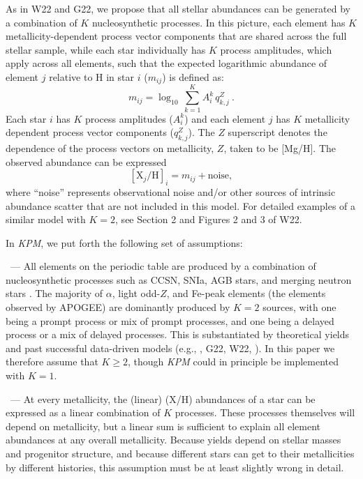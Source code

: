 \documentclass[modern]{aastex631}
\newcommand{\name}{\textsl{KPM}}
\renewcommand{\paragraph}[1]{\bigskip\par\noindent{\textbf{#1}}~---}
\begin{document}
As in W22 and G22, we propose that all stellar abundances can be generated by a combination of $K$ nucleosynthetic processes.
In this picture, each element has $K$ metallicity-dependent process vector components that are shared across the full stellar sample, while each star individually has $K$ process amplitudes, which apply across all elements, such that the expected logarithmic abundance of element $j$ relative to H in star $i$ ($m_{ij}$) is defined as:
\begin{equation}\label{eq:mij_k}
    m_{ij} = \log_{10} \, \sum^K_{k=1} A_i^k \, q_{k,j}^Z ~.
\end{equation}
Each star $i$ has $K$ process amplitudes ($A^k_i$)
and each element $j$ has $K$ metallicity dependent process vector components ($q_{k,j}^{Z}$). 
The $Z$ superscript denotes the dependence of the process vectors on metallicity, $Z$, taken to be [Mg/H].
The observed abundance can be expressed
\begin{equation}\label{eq:xh}
    [\text{X}_j/\text{H}]_i = m_{ij} + \text{noise},
\end{equation}
where ``noise'' represents observational noise and/or other sources of intrinsic abundance scatter that are not included in this model. For detailed examples of a similar model with $K=2$, see Section 2 and Figures 2 and 3 of W22.

In \name{}, we put forth the following set of assumptions: 

\paragraph{1. $K$ processes}
All elements on the periodic table are produced by a combination of nucleosynthetic processes such as CCSN, SNIa, AGB stars, and merging neutron stars \citep{johnsonja2020}. The majority of $\alpha$, light odd-$Z$, and Fe-peak elements (the elements observed by APOGEE) are dominantly produced by $K=2$ sources, with one being a prompt process or mix of prompt processes, and one being a delayed process or a mix of delayed processes. This is substantiated by theoretical yields \citep[e.g.,][]{anderson2019, rybizki2017} and past successful data-driven models (e.g., \citealp{ness2019}, G22, W22, \citealp{ting2022, ratcliffe2023}). In this paper we therefore assume that $K \geq 2$, though \name{} could in principle be implemented with $K=1$.

\paragraph{2. Linearity}
At every metallicity, the (linear) (X/H) abundances of a star can be expressed as a linear combination of $K$ processes.
These processes themselves will depend on metallicity, but a linear sum is sufficient to explain all element abundances at any overall metallicity.
Because yields depend on stellar masses and progenitor structure, and because different stars can get to their metallicities by different histories, this assumption must be at least slightly wrong in detail.
\end{document}
